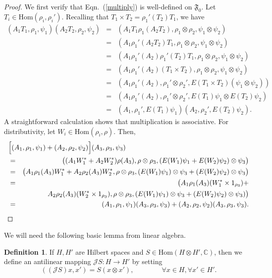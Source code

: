 \documentclass[11pt]{article}
\newcommand{\alg}[1]{\mathfrak{#1}}
\theoremstyle{definition}
\theoremstyle{definition}
\newtheorem{defn}[thm]{Definition}
\theoremstyle{remark}
\def\2#1{{\mathcal #1}}
\def\7#1{{\mathbb #1}}
\newcommand{\Hom}{\mathrm{Hom}}
\begin{document}
\begin{proof} We first verify that Eqn.\ (\ref{multiply}) is well-defined on $\alg{F}_0
  $.  Let $T_i\in \Hom (\rho _i,\rho _i')$.  Recalling that $T_1\times T_2=\rho
  _1'(T_2)T_1$, we have
\begin{eqnarray*}
  (A_1T_1,\rho _1,\psi _1)(A_2T_2,\rho _2,\psi _2) &=& (A_1T_1\rho _1(A_2T_2),\rho
  _1\otimes \rho _2,\psi _1\otimes \psi
  _2) \\
  &=& (A_1\rho _1'(A_2T_2)T_1,\rho _1\otimes \rho _2,\psi _1\otimes \psi _2) \\
  &=& (A_1\rho _1'(A_2)\rho _1'(T_2)T_1,\rho _1\otimes \rho _2,\psi _1\otimes \psi
  _2) \\
  &=& (A_1\rho _1'(A_2)(T_1\times T_2),\rho _1\otimes \rho _2,\psi _1\otimes \psi _2) \\
  &=& (A_1\rho _1'(A_2),\rho _1'\otimes \rho _2',E(T_1\times T_2)(\psi _1\otimes \psi _2)) \\
  &=& (A_1\rho _1'(A_2),\rho _1'\otimes \rho _2',E(T_1)\psi _1\otimes E(T_2)\psi _2) \\
  &=& (A_1,\rho _1',E(T_1)\psi _1)(A_2,\rho _2',E(T_2)\psi _2) .\end{eqnarray*} 
A straightforward calculation shows that multiplication is associative.  For
distributivity, let $W_i\in \Hom (\rho _i,\rho )$.  Then,
\begin{eqnarray*}
  \lefteqn{ \Bigl[ (A_1,\rho _1,\psi _1)+(A_2,\rho _2,\psi _2)\Bigr] (A_3,\rho _3,\psi _3) } \\
  &=& \bigl( (A_1W_1^*+A_2W_2^*)\rho
  (A_3),\rho \otimes \rho _3,(E(W_1)\psi _1+E(W_2)\psi _2)\otimes \psi _3 \bigr) \\
  &=& \bigl( A_1\rho _1(A_3)W_1^{*}+A_2\rho _2(A_3)W_2^*,\rho \otimes \rho _3,(E(W_1)\psi _1)\otimes \psi
  _3+(E(W_2)\psi _2)\otimes \psi _3 \bigr) \\
  &=& \bigl( A_1\rho _1(A_3)(W_1^{*}\times 1_{\rho _3})+\\
  && \qquad A_2\rho _2(A_3)(W_2^*\times 1_{\rho
    _3}), \rho \otimes \rho _3,(E(W_1)\psi _1)\otimes \psi _3+ (E(W_2)\psi _2)\otimes \psi _3 ) \bigr) \\
  &=& (A_1,\rho _1,\psi _1)(A_3,\rho _3,\psi _3)+(A_2,\rho _2,\psi _2)(A_3,\rho _3,\psi _3) .\end{eqnarray*}
\end{proof}

We will need the following basic lemma from linear algebra.

\begin{defn} If $H,H'$ are Hilbert spaces and $S\in \Hom (H\otimes H',\7C )$, then we
  define an antilinear mapping $\2JS:H\to H'$ by setting
  \[ ((\2JS)x,x')=S(x\otimes x') ,\qquad \qquad \forall x\in H,\forall
    x'\in H'.\]
\end{defn}
\end{document}
